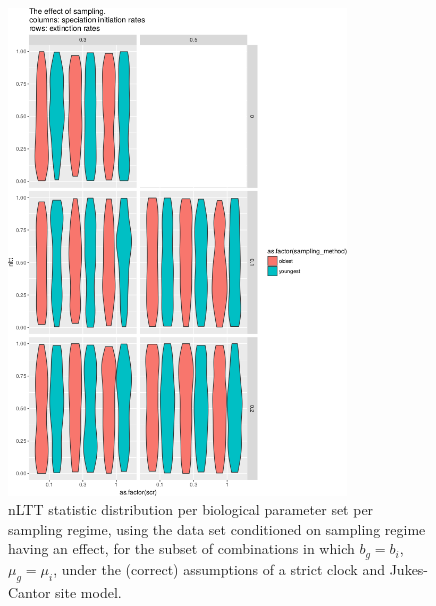\documentclass{article}
\begin{document}
\begin{figure}[!htbp]
  \includegraphics[width=0.8\textwidth]{fig_sampling.png}
  \caption{
    nLTT statistic distribution per biological parameter set per sampling
    regime, using the data set conditioned on sampling regime having an effect, 
    for the subset of combinations in which $b_g = b_i$, $\mu_g = \mu_i$, 
    under the (correct) assumptions of a strict clock and Jukes-Cantor site model.
  }
\end{figure}

\end{document}

